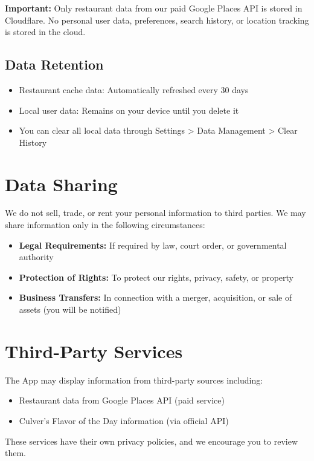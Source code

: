 \documentclass[11pt,letterpaper]{article}
\begin{document}
\textbf{Important:} Only restaurant data from our paid Google Places API is stored in Cloudflare. No personal user data, preferences, search history, or location tracking is stored in the cloud.

\subsection{Data Retention}
\begin{itemize}
    \item Restaurant cache data: Automatically refreshed every 30 days
    \item Local user data: Remains on your device until you delete it
    \item You can clear all local data through Settings > Data Management > Clear History
\end{itemize}

\section{Data Sharing}

We do not sell, trade, or rent your personal information to third parties. We may share information only in the following circumstances:
\begin{itemize}
    \item \textbf{Legal Requirements:} If required by law, court order, or governmental authority
    \item \textbf{Protection of Rights:} To protect our rights, privacy, safety, or property
    \item \textbf{Business Transfers:} In connection with a merger, acquisition, or sale of assets (you will be notified)
\end{itemize}

\section{Third-Party Services}

The App may display information from third-party sources including:
\begin{itemize}
    \item Restaurant data from Google Places API (paid service)
    \item Culver's Flavor of the Day information (via official API)
\end{itemize}

These services have their own privacy policies, and we encourage you to review them.
\end{document}

